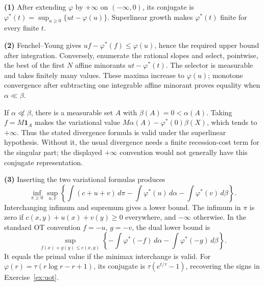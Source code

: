 \documentclass[11pt,a4paper]{article}
\theoremstyle{exostyle}
\begin{document}
\begin{solution}
\textbf{(1)} After extending $\varphi$ by $+\infty$ on $(-\infty,0)$, its conjugate is $\varphi^*(t)=\sup_{u\ge0}\{ut-\varphi(u)\}$. Superlinear growth makes $\varphi^*(t)$ finite for every finite $t$.

\textbf{(2)} Fenchel--Young gives $uf-\varphi^*(f)\le\varphi(u)$, hence the required upper bound after integration. Conversely, enumerate the rational slopes and select, pointwise, the best of the first $N$ affine minorants $u t-\varphi^*(t)$. The selector is measurable and takes finitely many values. These maxima increase to $\varphi(u)$; monotone convergence after subtracting one integrable affine minorant proves equality when $\alpha\ll\beta$.

If $\alpha\not\ll\beta$, there is a measurable set $A$ with $\beta(A)=0<\alpha(A)$. Taking $f=M\mathbf1_A$ makes the variational value $M\alpha(A)-\varphi^*(0)\beta(X)$, which tends to $+\infty$. Thus the stated divergence formula is valid under the superlinear hypothesis. Without it, the usual divergence needs a finite recession-cost term for the singular part; the displayed $+\infty$ convention would not generally have this conjugate representation.

\textbf{(3)} Inserting the two variational formulas produces
\[
\inf_{\pi\ge0}\sup_{u,v}
\left\{\int(c+u+v)\,d\pi-\int\varphi^*(u)\,d\alpha-\int\varphi^*(v)\,d\beta\right\}.
\]
Interchanging infimum and supremum gives a lower bound. The infimum in $\pi$ is zero if $c(x,y)+u(x)+v(y)\ge0$ everywhere, and $-\infty$ otherwise. In the standard OT convention $f=-u$, $g=-v$, the dual lower bound is
\[
\sup_{f(x)+g(y)\le c(x,y)}
\left\{-\int\varphi^*(-f)\,d\alpha-\int\varphi^*(-g)\,d\beta\right\}.
\]
It equals the primal value if the minimax interchange is valid. For $\varphi(r)=\tau(r\log r-r+1)$, its conjugate is $\tau(e^{t/\tau}-1)$, recovering the signs in Exercise~\ref{ex:uot}.
\end{solution}
\end{document}
